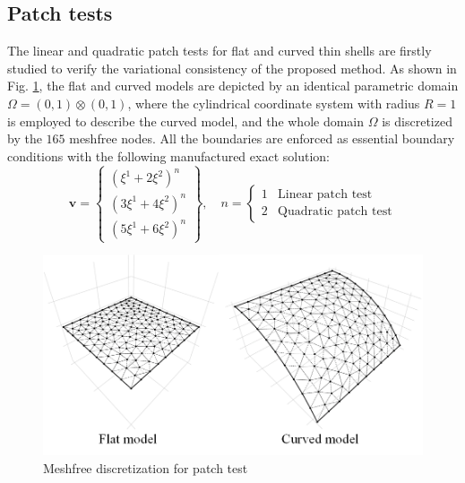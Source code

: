 \subsection{Patch tests}
The linear and quadratic patch tests for flat and curved thin shells are firstly studied to verify the variational consistency of the proposed method. As shown in Fig. \ref{ptf1}, the flat and curved models are depicted by an identical parametric domain $\Omega = (0,1)\otimes(0,1)$, where the cylindrical coordinate system with radius $R=1$\DIFaddbegin {}\DIFaddend is employed to describe the curved model, and the whole domain $\Omega$ is discretized by the $165$ meshfree nodes. \DIFaddbegin {}\DIFaddend All the boundaries are enforced as essential boundary conditions with the following manufactured exact solution:
\begin{equation}
\boldsymbol v = \begin{Bmatrix}
(\xi^1+2\xi^2)^n \\ (3\xi^1+4\xi^2)^n \\ (5\xi^1+6\xi^2)^n
\end{Bmatrix},\quad
n = \begin{cases}
1 & \text{Linear patch test} \\
2 & \text{Quadratic patch test}
\end{cases}
\end{equation}

\begin{figure}[!ht]
    \centering
    \includegraphics[width=\textwidth]{figures/ptmsh}
    \caption{Meshfree discretization for patch test}\label{ptf1}
\end{figure}

